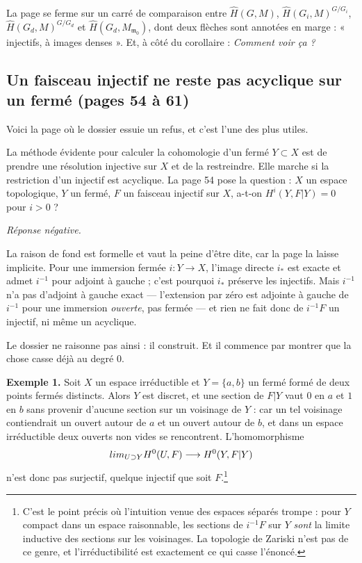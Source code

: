 \documentclass[11pt,a4paper]{article}
\begin{document}
La page se ferme sur un carré de comparaison entre $\widehat{H}(G,M)$,
$\widehat{H}(G_i,M)^{G/G_i}$, $\widehat{H}(G_d,M)^{G/G_d}$ et
$\widehat{H}(G_d, M_{\mathfrak{m}_0})$, dont deux flèches sont annotées en
marge : « injectifs, à images denses ». Et, à côté du corollaire :
\emph{Comment voir ça ?}

\subsection*{Un faisceau injectif ne reste pas acyclique sur un fermé (pages 54 à 61)}

Voici la page où le dossier essuie un refus, et c'est l'une des plus utiles.

La méthode évidente pour calculer la cohomologie d'un fermé $Y \subset X$ est
de prendre une résolution injective sur $X$ et de la restreindre. Elle marche
si la restriction d'un injectif est acyclique. La page 54 pose la question :
$X$ un espace topologique, $Y$ un fermé, $F$ un faisceau injectif sur $X$, a-t-on
$H^i(Y, F|Y) = 0$ pour $i > 0$ ?

\emph{Réponse négative.}

La raison de fond est formelle et vaut la peine d'être dite, car la page la
laisse implicite. Pour une immersion fermée $i : Y \to X$, l'image directe
$i_{*}$ est exacte et admet $i^{-1}$ pour adjoint à gauche ; c'est pourquoi
$i_{*}$ préserve les injectifs. Mais $i^{-1}$ n'a pas d'adjoint à gauche exact
— l'extension par zéro est adjointe à gauche de $i^{-1}$ pour une immersion
\emph{ouverte}, pas fermée — et rien ne fait donc de $i^{-1}F$ un injectif, ni
même un acyclique.

Le dossier ne raisonne pas ainsi : il construit. Et il commence par montrer que
la chose casse déjà au degré $0$.

\textbf{Exemple 1.} Soit $X$ un espace irréductible et $Y = \{a,b\}$ un fermé
formé de deux points fermés distincts. Alors $Y$ est discret, et une section de
$F|Y$ vaut $0$ en $a$ et $1$ en $b$ sans provenir d'aucune section sur un
voisinage de $Y$ : car un tel voisinage contiendrait un ouvert autour de $a$ et
un ouvert autour de $b$, et dans un espace irréductible deux ouverts non vides
se rencontrent. L'homomorphisme
\[
\varinjlim_{U \supset Y} H^0(U,F) \longrightarrow H^0(Y, F|Y)
\]
n'est donc pas surjectif, quelque injectif que soit $F$.\footnote{C'est le point
précis où l'intuition venue des espaces séparés trompe : pour $Y$ compact dans
un espace raisonnable, les sections de $i^{-1}F$ sur $Y$ \emph{sont} la limite
inductive des sections sur les voisinages. La topologie de Zariski n'est pas de
ce genre, et l'irréductibilité est exactement ce qui casse l'énoncé.}
\end{document}
